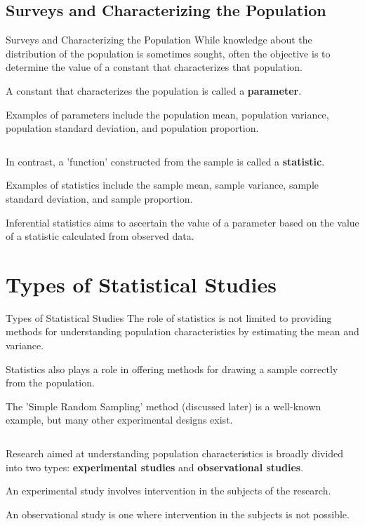 \documentclass[dvipdfmx, autodetect-engine, aspectratio=169, 10.5pt]{beamer}
\begin{document}
\subsection{Surveys and Characterizing the Population}

\begin{frame}{Surveys and Characterizing the Population}
	While knowledge about the distribution of the population is sometimes sought, often the objective is to determine the value of a constant that characterizes that population.

	A constant that characterizes the population is called a \textbf{parameter}.

	Examples of parameters include the population mean, population variance, population standard deviation, and population proportion.

	${}$

	In contrast, a 'function' constructed from the sample is called a \textbf{statistic}.

	Examples of statistics include the sample mean, sample variance, sample standard deviation, and sample proportion.

	Inferential statistics aims to ascertain the value of a parameter based on the value of a statistic calculated from observed data.
\end{frame}

\section{Types of Statistical Studies}

\begin{frame}{Types of Statistical Studies}
	The role of statistics is not limited to providing methods for understanding population characteristics by estimating the mean and variance.

	Statistics also plays a role in offering methods for drawing a sample correctly from the population.

	The 'Simple Random Sampling' method (discussed later) is a well-known example, but many other experimental designs exist.

	${}$

	Research aimed at understanding population characteristics is broadly divided into two types: \textbf{experimental studies} and \textbf{observational studies}.

	An experimental study involves intervention in the subjects of the research.

	An observational study is one where intervention in the subjects is not possible.
\end{frame}
\end{document}
